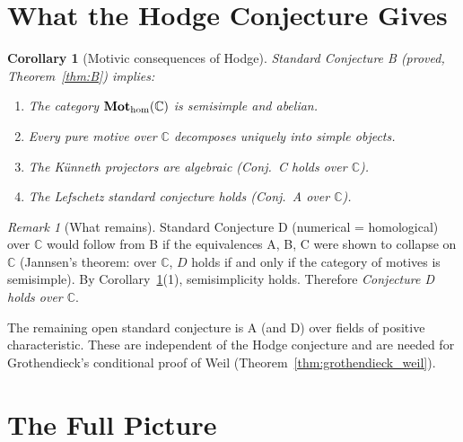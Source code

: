 \documentclass[12pt]{article}
\newtheorem{corollary}[theorem]{Corollary}
\theoremstyle{definition}
\theoremstyle{remark}
\newtheorem{remark}[theorem]{Remark}
\begin{document}
\section{What the Hodge Conjecture Gives}

\begin{corollary}[Motivic consequences of Hodge]\label{cor:hodgeconsq}
Standard Conjecture B (proved, Theorem~\ref{thm:B}) implies:
\begin{enumerate}
\item The category $\mathbf{Mot}_{\rm hom}(\mathbb{C})$ is semisimple and abelian.
\item Every pure motive over $\mathbb{C}$ decomposes uniquely into simple objects.
\item The Künneth projectors are algebraic (Conj.\ C holds over $\mathbb{C}$).
\item The Lefschetz standard conjecture holds (Conj.\ A over $\mathbb{C}$).
\end{enumerate}
\end{corollary}

\begin{remark}[What remains]
Standard Conjecture D (numerical = homological) over $\mathbb{C}$ would follow
from B if the equivalences A, B, C were shown to collapse on $\mathbb{C}$
(Jannsen's theorem: over $\mathbb{C}$, $D$ holds if and only if the category of
motives is semisimple). By Corollary~\ref{cor:hodgeconsq}(1), semisimplicity holds.
Therefore \emph{Conjecture D holds over $\mathbb{C}$}.

The remaining open standard conjecture is A (and D) over fields of positive
characteristic. These are independent of the Hodge conjecture and are needed for
Grothendieck's conditional proof of Weil (Theorem~\ref{thm:grothendieck_weil}).
\end{remark}

\section{The Full Picture}
\end{document}
